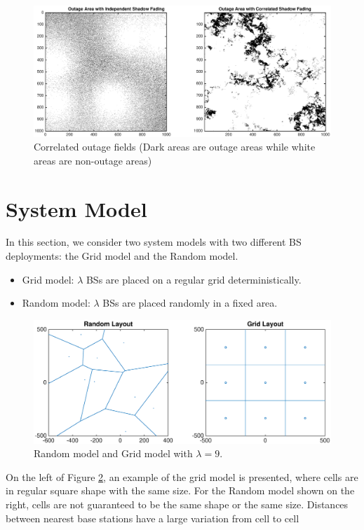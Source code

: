  \begin{figure}
 \centering
 \includegraphics[width=14cm]{outageArea.eps}
 \caption{Correlated outage fields (Dark areas are outage areas while white areas are non-outage areas)}
 \label{4:outagefie}
 \end{figure}


 \section{System Model}
 \label{4:SystemModel}
 In this section, we consider two system models with two different BS deployments: the Grid model and the Random model.
 \begin{itemize}
 \item Grid model: $\lambda$ BSs are placed on a regular grid deterministically.
 \item Random model: $\lambda$ BSs are placed randomly in a fixed area.
 \end{itemize}
 \begin{figure}
 \centering
 \includegraphics[width=14cm]{systemLayout.eps}
 \caption{Random model and Grid model with $\lambda = 9$.}
 \label{4:RandomLayout}
 \end{figure}
On the left of Figure \ref{4:RandomLayout}, an example of the grid model is presented, where cells are in regular square shape with the same size. For the Random model shown on the right, cells are not guaranteed to be the same shape or the same size. Distances between nearest base stations have a large variation from cell to cell



